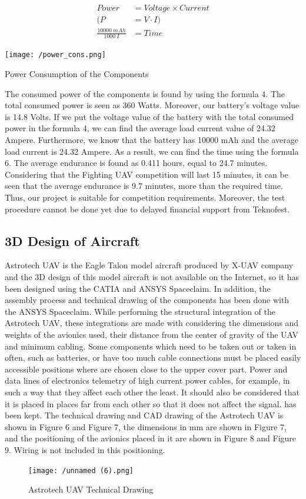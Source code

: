 \documentclass[12pt]{article}
\begin{document}
\begin{align}
	Power&= Voltage  \times Current \\
	 (P &= V \cdot I)\\
	\frac{10000 \ mAh}{1000 \ I } &= Time 
\end{align}

\begin{table}[ht]
 	\centering
 	\texttt{[image: /power\_cons.png]}
 	\caption{Power Consumption of the Components}
        \label{fig:pwr_cns}
 \end{table}
\FloatBarrier
\justify
The consumed power of the components is found by using the formula 4. The total consumed power is seen as 360 Watts. Moreover, our battery’s voltage value is 14.8 Volts. If we put the voltage value of the battery with the total consumed power in the formula 4, we can find the average load current value of 24.32 Ampere. Furthermore, we know that the battery has 10000 mAh and the average load current is 24.32 Ampere. As a result, we can find the time using the formula 6. The average endurance is found as 0.411 hours, equal to 24.7 minutes. Considering that the Fighting UAV competition will last 15 minutes, it can be seen that the average endurance is 9.7 minutes, more than the required time. Thus, our project is suitable for competition requirements.  Moreover, the test procedure cannot be done yet due to delayed financial support from Teknofest.

\subsection{3D Design of Aircraft}

Astrotech UAV is the Eagle Talon model aircraft produced by X-UAV company and the 3D design of this model aircraft is not available on the Internet, so it has been designed using the CATIA and ANSYS Spaceclaim. In addition, the assembly process and technical drawing of the components has been done with the ANSYS Spaceclaim. While performing the structural integration of the Astrotech UAV, these integrations are made with considering the dimensions and weights of the avionics used, their distance from the center of gravity of the UAV and minimum cabling. Some components which need to be taken out or taken in often, such as batteries, or have too much cable connections must be placed easily accessible positions where are chosen close to the upper cover part. Power and data lines of electronics telemetry of high current power cables, for example, in such a way that they affect each other the least. It should also be considered that it is placed in places far from each other so that it does not affect the signal. has been kept. The technical drawing and CAD drawing of the Astrotech UAV is shown in Figure 6 and Figure 7, the dimensions in mm are shown in Figure 7, and the positioning of the avionics placed in it are shown in Figure 8 and Figure 9. Wiring is not included in this positioning.
\begin{figure}[ht]
 	\centering
 	\texttt{[image: /unnamed (6).png]}
 	\caption{Astrotech UAV Technical Drawing}
        \label{fig:Tech_izo}
 \end{figure}
\FloatBarrier
\end{document}
